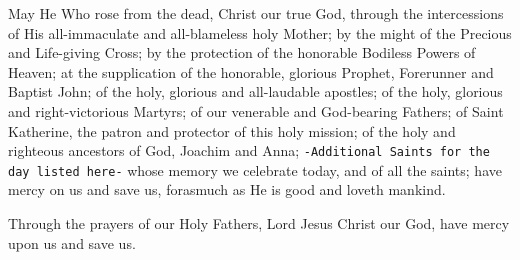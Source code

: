 \documentclass[twoside, letterpaper, 12pt]{report}
\newcommand{\instruction}[1]{%
  \texttt{\scriptsize{#1}}%
}
\begin{document}
\begin{priest}
\item May He Who rose from the dead, Christ our true God, through the intercessions of His
    all-immaculate and all-blameless holy Mother; by the might of the Precious and Life-giving Cross;
    by the protection of the honorable Bodiless Powers of Heaven;
    at the supplication of the honorable, glorious Prophet, Forerunner and Baptist John;
    of the holy, glorious and all-laudable apostles;
    of the holy, glorious and right-victorious Martyrs;
    of our venerable and God-bearing Fathers;
    of Saint Katherine, the patron and protector of this holy mission;
    of the holy and righteous ancestors of God, Joachim and Anna;
    \instruction{-Additional Saints for the day listed here-} whose memory we celebrate today,
    and of all the saints;
    have mercy on us and save us, forasmuch as He is good and loveth mankind.
\item Through the prayers of our Holy Fathers, Lord Jesus Christ our God,
    have mercy upon us and save us.
\end{priest}
\end{document}
